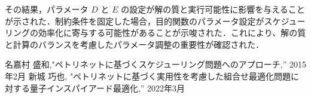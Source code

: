 \documentclass[conference]{IEEEtran}
\begin{document}
その結果，パラメータ $D$ と $E$ の設定が解の質と実行可能性に影響を与えることが示された．制約条件を固定した場合，目的関数のパラメータ設定がスケジューリングの効率化に寄与する可能性があることが示唆された．これにより、解の質と計算のバランスを考慮したパラメータ調整の重要性が確認された．

\begin{thebibliography}{00}
 名嘉村 盛和,"ペトリネットに基づくスケジューリング問題へのアプローチ,'' 2015年2月
 新城 巧也, "ペトリネットに基づく実用性を考慮した組合せ最適化問題に対する量子インスパイアード最適化,'' 2022年3月
\end{thebibliography}
\end{document}
